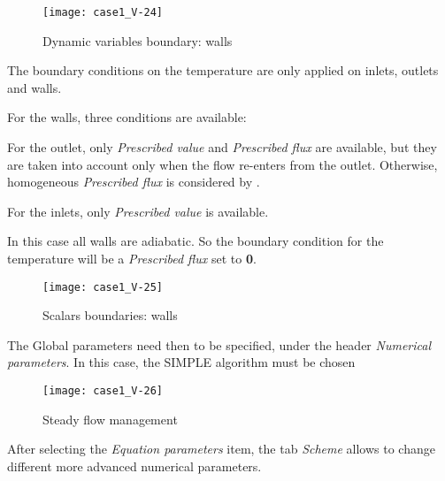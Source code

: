 \begin{figure}[ht]
\begin{center}
\texttt{[image: case1\_V-24]}
\caption{Dynamic variables boundary: walls}
\label{fig28_e1}
\end{center}
\end{figure}


\clearpage
The boundary conditions
on the temperature are only applied on inlets, outlets and walls.

For the walls, three conditions are available:\\

For the outlet, only {\itshape Prescribed value} and {\itshape Prescribed flux}
are available, but they are taken into account only when the flow re-enters
from the outlet. Otherwise, homogeneous {\itshape Prescribed flux} is
considered by \CS.

For the inlets, only {\itshape Prescribed value} is available.

In this case all walls are adiabatic. So the boundary condition for the
temperature will be a {\itshape Prescribed flux} set to {\bf 0}.
\begin{figure}[ht]
\begin{center}
\texttt{[image: case1\_V-25]}
\caption{Scalars boundaries: walls}
\label{fig30_e1}
\end{center}
\end{figure}


\clearpage
The Global parameters need then to be specified, under the header {\itshape
Numerical parameters}. In this case, the SIMPLE algorithm must be chosen
\begin{figure}[ht]
\begin{center}
\texttt{[image: case1\_V-26]}
\caption{Steady flow management}
\label{fig32_e1}
\end{center}
\end{figure}


\clearpage
After selecting the {\itshape Equation parameters} item, the tab {\itshape Scheme}
allows to change different more advanced numerical parameters.

